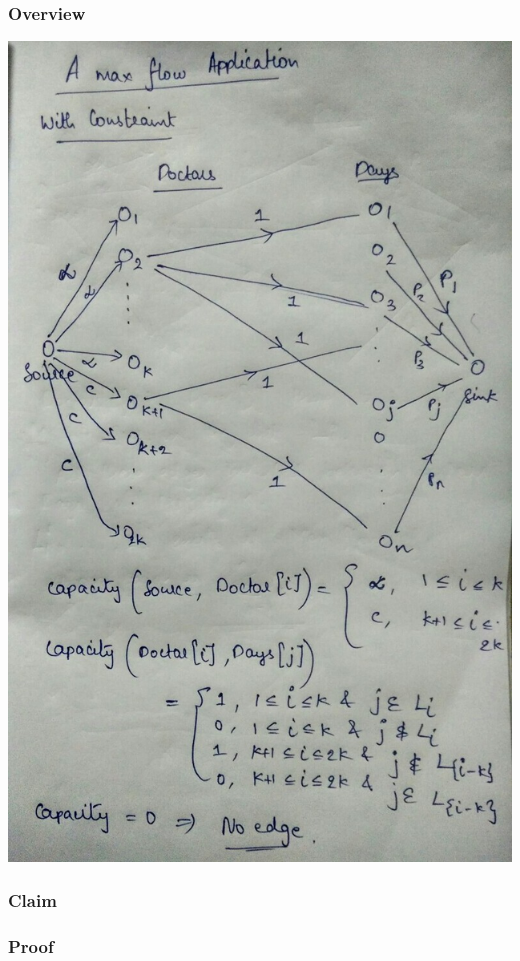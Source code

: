 \documentclass{article}
\begin{document}
\subsubsection{Overview}
\includegraphics[scale=0.5]{3b.jpg}
\subsubsection{Claim}
\subsubsection{Proof}
\end{document}
